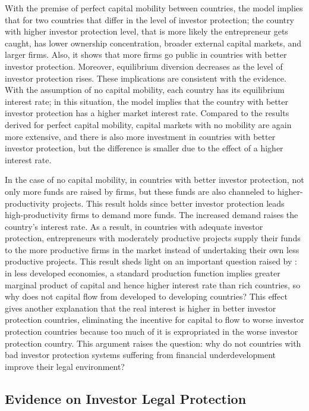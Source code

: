 \documentclass[final,1p,authoryear]{elsarticle}
\begin{document}
With the premise of perfect capital mobility between countries, the model implies that for two countries that differ in the level of investor protection; the country with higher investor protection level, that is more likely the entrepreneur gets caught, has lower ownership concentration, broader external capital markets, and larger firms. Also, it shows that more firms go public in countries with better investor protection. Moreover, equilibrium diversion decreases as the level of investor protection rises. These implications are consistent with the evidence. With the assumption of no capital mobility, each country has its equilibrium interest rate; in this situation, the model implies that the country with better investor protection has a higher market interest rate. Compared to the results derived for perfect capital mobility, capital markets with no mobility are again more extensive, and there is also more investment in countries with better investor protection, but the difference is smaller due to the effect of a higher interest rate. 

In the case of no capital mobility, in countries with better investor protection, not only more funds are raised by firms, but these funds are also channeled to higher-productivity projects. This result holds since better investor protection leads high-productivity ﬁrms to demand more funds. The increased demand raises the country's interest rate. As a result, in countries with adequate investor protection, entrepreneurs with moderately productive projects supply their funds to the more productive firms in the market instead of undertaking their own less productive projects. This result sheds light on an important question raised by \cite{RePEc:aea:aecrev:v:80:y:1990:i:2:p:92-96}: in less developed economies, a standard production function implies greater marginal product of capital and hence higher interest rate than rich countries, so why does not capital flow from developed to developing countries? This effect gives another explanation that the real interest is higher in better investor protection countries, eliminating the incentive for capital to flow to worse investor protection countries because too much of it is expropriated in the worse investor protection country. This argument raises the question: why do not countries with bad investor protection systems suffering from financial underdevelopment improve their legal environment?


\subsection{Evidence on Investor Legal Protection}
\end{document}
